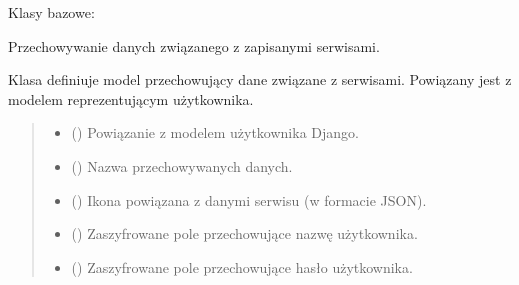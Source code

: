 \documentclass[letterpaper,10pt,polish]{sphinxmanual}
\begin{document}
\begin{fulllineitems}
\label{\detokenize{mainApp:mainApp.models.CreditStorage}}
\pysigstartsignatures
{}
\pysigstopsignatures
\sphinxAtStartPar
Klasy bazowe: 

\sphinxAtStartPar
Przechowywanie danych związanego z zapisanymi serwisami.

\sphinxAtStartPar
Klasa  definiuje model przechowujący dane związane z serwisami.
Powiązany jest z modelem  reprezentującym użytkownika.
\begin{quote}\begin{description}
\begin{itemize}
\item {} 
\sphinxAtStartPar
{} () \textendash{} Powiązanie z modelem użytkownika Django.

\item {} 
\sphinxAtStartPar
{} () \textendash{} Nazwa przechowywanych danych.

\item {} 
\sphinxAtStartPar
{} () \textendash{} Ikona powiązana z danymi serwisu (w formacie JSON).

\item {} 
\sphinxAtStartPar
{} () \textendash{} Zaszyfrowane pole przechowujące nazwę użytkownika.

\item {} 
\sphinxAtStartPar
{} () \textendash{} Zaszyfrowane pole przechowujące hasło użytkownika.

\end{itemize}

\end{description}\end{quote}


\end{fulllineitems}
\end{document}
